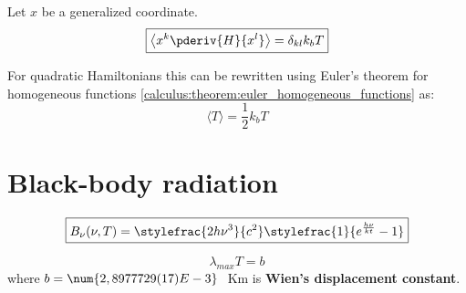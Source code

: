 	\begin{theorem}
		Let $x$ be a generalized coordinate.
		\begin{equation}
			\boxed{\left\langle x^k\pderiv{H}{x^l} \right\rangle = \delta_{kl}k_bT}
		\end{equation}
	\end{theorem}
	\begin{result}
		For quadratic Hamiltonians this can be rewritten using Euler's theorem for homogeneous functions \ref{calculus:theorem:euler_homogeneous_functions} as:
		\begin{equation}
			\langle T \rangle = \frac{1}{2}k_bT
		\end{equation}
	\end{result}
	
\section{Black-body radiation}
	\begin{formula}
		\begin{equation}
			\label{photon:plancks_law_frequency}
            \boxed{B_\nu(\nu, T) = \stylefrac{2h\nu^3}{c^2}\stylefrac{1}{e^{\frac{h\nu}{kt}} - 1}}
		\end{equation}
	\end{formula}
    
	\begin{formula}
		\begin{equation}
			\label{photon:wiens_displacement_law}
			\boxed{\lambda_{max}T = b}
		\end{equation}
		where $b = \num{2,8977729(17)E-3}\ $ Km is \textbf{Wien's displacement constant}.
	\end{formula}
